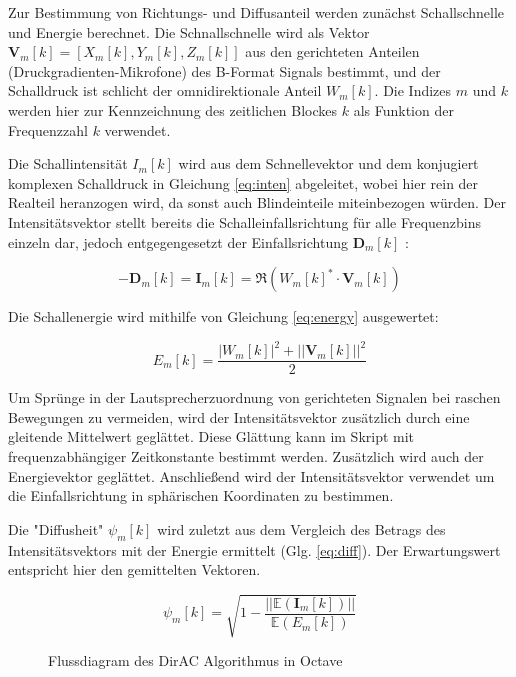 Zur Bestimmung von Richtungs- und Diffusanteil werden zunächst Schallschnelle und Energie berechnet. Die Schnallschnelle wird als Vektor $\textbf{V}_{m}[k] = [X_{m}[k], Y_{m}[k], Z_{m}[k]]$ aus den gerichteten Anteilen (Druckgradienten-Mikrofone) des B-Format Signals bestimmt, und der Schalldruck ist schlicht der omnidirektionale Anteil $W_{m}[k]$. Die Indizes $m$ und $k$ werden hier zur Kennzeichnung des zeitlichen Blockes $k$ als Funktion der Frequenzzahl $k$ verwendet.

Die Schallintensität $I_{m}[k]$ wird aus dem Schnellevektor und dem konjugiert komplexen Schalldruck in Gleichung \ref{eq:inten} abgeleitet, wobei hier rein der Realteil heranzogen wird, da sonst auch Blindeinteile miteinbezogen würden. Der Intensitätsvektor stellt bereits die Schalleinfallsrichtung für alle Frequenzbins einzeln dar, jedoch entgegengesetzt der Einfallsrichtung $\textbf{D}_{m}[k]$ :

\begin{equation}
    -\textbf{D}_{m}[k] = \textbf{I}_{m}[k] = \Re(W_{m}[k]^{*} \cdot \textbf{V}_{m}[k])
    \label{eq:inten}
\end{equation}

Die Schallenergie wird mithilfe von Gleichung \ref{eq:energy} ausgewertet:

\begin{equation}
    E_{m}[k] = \frac{|W_{m}[k]|^2+||\textbf{V}_{m}[k]||^2}{2}
    \label{eq:energy}
\end{equation}

Um Sprünge in der Lautsprecherzuordnung von gerichteten Signalen bei raschen Bewegungen zu vermeiden, wird der Intensitätsvektor zusätzlich durch eine gleitende Mittelwert geglättet. Diese Glättung kann im Skript mit frequenzabhängiger Zeitkonstante bestimmt werden. Zusätzlich wird auch der Energievektor geglättet. Anschließend wird der Intensitätsvektor verwendet um die Einfallsrichtung in sphärischen Koordinaten zu bestimmen.

Die "Diffusheit" $\psi_{m}[k]$ wird zuletzt aus dem Vergleich des Betrags des Intensitätsvektors mit der Energie ermittelt (Glg. \ref{eq:diff}). Der Erwartungswert entspricht hier den gemittelten Vektoren.

\begin{equation}
    \psi_{m}[k] = \sqrt{1 - \frac{||\mathbb{E}(\textbf{I}_{m}[k])||}{\mathbb{E}(E_{m}[k])}}
    \label{eq:diff}
\end{equation}

\begin{figure}
  \centering
  \caption{Flussdiagram des DirAC Algorithmus in Octave}
\end{figure}